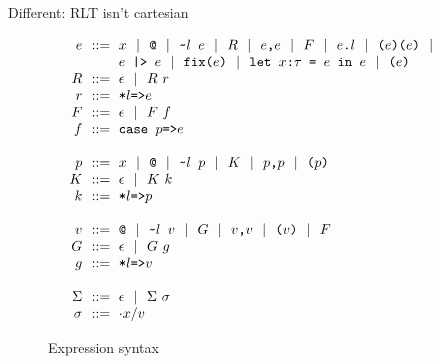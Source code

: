 \documentclass[acmsmall]{acmart}
\theoremstyle{definition}
\begin{document}
Different: RLT isn't cartesian




\begin{figure*}[h]
  \[\begin{array}[t]{r@{}l}
    \nonterm{e} & \is 
      \begin{array}[t]{@{}l}
      \code{$x$} \sep 
      \code{@} \sep
      \code{\textasciitilde{}$l$ $e$} \sep 
      R \sep
      \code{$e$,$e$} \sep
      F \sep 
      \code{$e$.$l$} \sep
      \code{($e$)($e$)} \sep
      \\
      \code{$e$ |> $e$} \sep
      \code{fix($e$)} \sep
      \code{let $x$:$\tau$ = $e$ in $e$} \sep
      \code{($e$)}
      \end{array}
    \\
    \nonterm{R} & \is \epsilon \sep R\ r
    \\
    \nonterm{r} & \is \code{*$l$=>$e$}
    \\
    \nonterm{F} & \is \epsilon \sep F\ f
    \\
    \nonterm{f} & \is \code{case $p$=>$e$}
    \\
    \\
    \nonterm{p} & \is 
      \code{$x$} \sep
      \code{@} \sep
      \code{\textasciitilde{}$l$ $p$} \sep
      K \sep
      \code{$p$,$p$} \sep
      \code{($p$)} 
    \\
    \nonterm{K} & \is \epsilon \sep K\ k
    \\
    \nonterm{k} & \is \code{*$l$=>$p$}
    \\
    \\
    \nonterm{v} & \is 
      \code{@} \sep
      \code{\textasciitilde{}$l$ $v$} \sep
      G \sep
      \code{$v$,$v$} \sep
      \code{($v$)} \sep
      F 
    \\
    \nonterm{G} & \is \epsilon \sep G\ g
    \\
    \nonterm{g} & \is \code{*$l$=>$v$}
    \\
    \\
    \nonterm{\Sigma} & \is \epsilon \sep \Sigma\ \sigma
    \\
    \nonterm{\sigma} & \is \cdot x \slash v
    \\
  \end{array}\]
  \caption{Expression syntax}
  \label{fig:expression_syntax}
\end{figure*}
\end{document}
